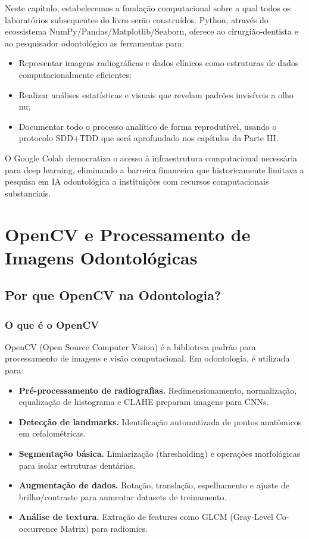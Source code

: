 Neste capítulo, estabelecemos a fundação computacional sobre a qual todos os laboratórios subsequentes do livro serão construídos. Python, através do ecossistema NumPy/Pandas/Matplotlib/Seaborn, oferece ao cirurgião-dentista e ao pesquisador odontológico as ferramentas para:

\begin{itemize}
    \item Representar imagens radiográficas e dados clínicos como estruturas de dados computacionalmente eficientes;
    \item Realizar análises estatísticas e visuais que revelam padrões invisíveis a olho nu;
    \item Documentar todo o processo analítico de forma reprodutível, usando o protocolo SDD+TDD que será aprofundado nos capítulos da Parte III.
\end{itemize}

O Google Colab democratiza o acesso à infraestrutura computacional necessária para deep learning, eliminando a barreira financeira que historicamente limitava a pesquisa em IA odontológica a instituições com recursos computacionais substanciais.

\section{OpenCV e Processamento de Imagens Odontológicas}

\subsection{Por que OpenCV na Odontologia?}

\subsubsection{O que é o OpenCV}

OpenCV (Open Source Computer Vision)  é a biblioteca padrão para processamento de imagens e visão computacional. Em odontologia, é utilizada para:

\begin{itemize}
    \item \textbf{Pré-processamento de radiografias.} Redimensionamento, normalização, equalização de histograma e CLAHE preparam imagens para CNNs.
    \item \textbf{Detecção de landmarks.} Identificação automatizada de pontos anatômicos em cefalométricas.
    \item \textbf{Segmentação básica.} Limiarização (thresholding) e operações morfológicas para isolar estruturas dentárias.
    \item \textbf{Augmentação de dados.} Rotação, translação, espelhamento e ajuste de brilho/contraste para aumentar datasets de treinamento.
    \item \textbf{Análise de textura.} Extração de features como GLCM (Gray-Level Co-occurrence Matrix) para radiomics.
\end{itemize}

